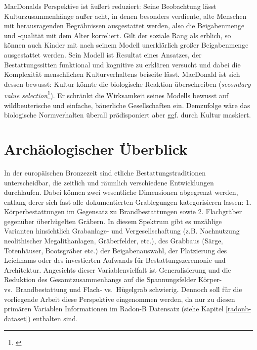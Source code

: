 \documentclass[openany,twoside,twocolumn]{book}
\let\rmarkdownfootnote\footnote%
\def\footnote{\protect\rmarkdownfootnote}
\begin{document}
MacDonalds Perspektive ist äußert reduziert: Seine Beobachtung lässt
Kulturzusammenhänge außer acht, in denen besonders verdiente, alte
Menschen mit herausragenden Begräbnissen ausgestattet werden, also die
Beigabenmenge und -qualität mit dem Alter korreliert. Gilt der soziale
Rang als erblich, so können auch Kinder mit nach seinem Modell
unerklärlich großer Beigabenmenge ausgestattet werden. Sein Modell ist
Resultat eines Ansatzes, der Bestattungssitten funktional und kognitive
zu erklären versucht und dabei die Komplexität menschlichen
Kulturverhaltens beiseite lässt. MacDonald ist sich dessen bewusst:
Kultur könnte die biologische Reaktion überschreiben (\emph{secondary
value selection}\footnote{\textcite{durham_coevolution_1991-1}}). Er
schränkt die Wirksamkeit seines Modells bewusst auf wildbeuterische und
einfache, bäuerliche Gesellschaften ein. Demzufolge wäre das biologische
Normverhalten überall prädisponiert aber ggf. durch Kultur maskiert.

\hypertarget{regions-archaeological-overview}{%
\section{Archäologischer
Überblick}\label{regions-archaeological-overview}}

In der europäischen Bronzezeit sind etliche Bestattungstraditionen
unterscheidbar, die zeitlich und räumlich verschiedene Entwicklungen
durchlaufen. Dabei können zwei wesentliche Dimensionen abgegrenzt
werden, entlang derer sich fast alle dokumentierten Grablegungen
kategorisieren lassen: 1. Körperbestattungen im Gegensatz zu
Brandbestattungen sowie 2. Flachgräber gegenüber überhügelten Gräbern.
In diesem Spektrum gibt es unzählige Varianten hinsichtlich Grabanlage-
und Vergesellschaftung (z.B. Nachnutzung neolithischer Megalithanlagen,
Gräberfelder, etc.), des Grabbaus (Särge, Totenhäuser, Bootsgräber etc.)
der Beigabenauswahl, der Platzierung des Leichnams oder des investierten
Aufwands für Bestattungszeremonie und Architektur. Angesichts dieser
Variablenvielfalt ist Generalisierung und die Reduktion des
Gesamtzusammenhangs auf die Spannungsfelder Körper- vs.~Brandbestattung
und Flach- vs.~Hügelgrab schwierig. Dennoch soll für die vorliegende
Arbeit diese Perspektive eingenommen werden, da nur zu diesen primären
Variablen Informationen im Radon-B Datensatz (siehe Kapitel
\ref{radonb-dataset}) enthalten sind.
\end{document}
